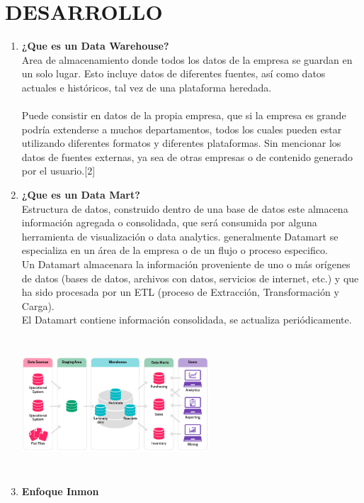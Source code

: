 \documentclass[twoside,twocolumn]{article}
\begin{document}
\section{DESARROLLO}
\begin{enumerate}
 \item \textbf{¿Que es un Data Warehouse?}\\
Area de almacenamiento donde todos los datos de la empresa se guardan en un solo lugar. Esto incluye datos de diferentes fuentes, así como datos actuales e históricos, tal vez de una plataforma heredada.\\ \\
Puede consistir en datos de la propia empresa, que si la empresa es grande podría extenderse a muchos departamentos, todos los cuales pueden estar utilizando diferentes formatos y diferentes plataformas. Sin mencionar los datos de fuentes externas, ya sea de otras empresas o de contenido generado por el usuario.[2]

 \item \textbf{¿Que es un Data Mart?} \\
Estructura de datos, construido dentro de una base de datos este almacena información agregada o consolidada, que será consumida por alguna herramienta de visualización o data analytics. generalmente Datamart se especializa en un área de la empresa o de un flujo o proceso especifico. \\

Un Datamart almacenara la información proveniente de uno o más orígenes de datos (bases de datos, archivos con datos, servicios de internet, etc.) y que ha sido procesada por un ETL (proceso de Extracción, Transformación y Carga).\\

El Datamart contiene información consolidada, se actualiza periódicamente.

\includegraphics[width=7cm, height=5cm]{Imagenes/datawarehouse_datamart}

 \item \textbf{Enfoque Inmon}


\end{enumerate}
\end{document}
